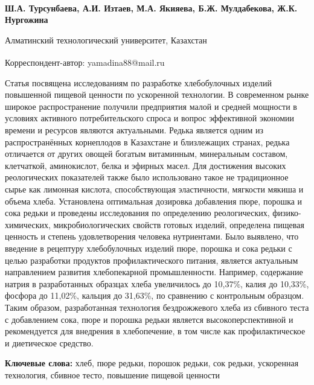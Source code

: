 
\begin{articleheader}

{\bfseries
Ш.А. Турсунбаева,
А.И. Изтаев,
М.А. Якияева\textsuperscript{\envelope },
Б.Ж. Мулдабекова,
Ж.К. Нургожина
}
\end{articleheader}

\begin{affiliation}
Алматинский технологический университет, Казахстан

\raggedright \textsuperscript{\envelope }Корреспондент-автор: yamadina88@mail.ru
\end{affiliation}

Статья посвящена исследованиям по разработке хлебобулочных изделий
повышенной пищевой ценности по ускоренной технологии. В современном
рынке широкое распространение получили предприятия малой и средней
мощности в условиях активного потребительского спроса и вопрос
эффективной экономии времени и ресурсов являются актуальными. Редька
является одним из распространённых корнеплодов в Казахстане и
близлежащих странах, редька отличается от других овощей богатым
витаминным, минеральным составом, клетчаткой, аминокислот, белка и
эфирных масел. Для достижения высоких реологических показателей также
было использовано такое не традиционное сырье как лимонная кислота,
способствующая эластичности, мягкости мякиша и объема хлеба. Установлена
оптимальная дозировка добавления пюре, порошка и сока редьки и проведены
исследования по определению реологических, физико-химических,
микробиологических свойств готовых изделий, определена пищевая ценность
и степень удовлетворения человека нутриентами. Было выявлено, что
введение в рецептуру хлебобулочных изделий пюре, порошка и сока редьки с
целью разработки продуктов профилактического питания, является
актуальным направлением развития хлебопекарной промышленности. Например,
содержание натрия в разработанных образцах хлеба увеличилось до 10,37\%,
калия до 10,33\%, фосфора до 11,02\%, кальция до 31,63\%, по сравнению с
контрольным образцом. Таким образом, разработанная технология
бездрожжевого хлеба из сбивного теста с добавлением сока, пюре и порошка
редьки является высокоперспективной и рекомендуется для внедрения в
хлебопечение, в том числе как профилактическое и диетическое средство.

{\bfseries Ключевые слова:} хлеб, пюре редьки, порошок редьки, сок редьки,
ускоренная технология, сбивное тесто, повышение пищевой ценности

